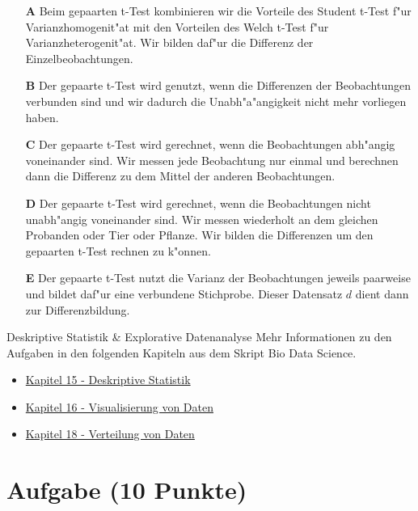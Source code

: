 \documentclass[a4paper, 10pt]{scrartcl}\usepackage[]{graphicx}\usepackage[]{xcolor}
\begin{document}
\begin{enumerate}
\item [\textbf{A} \msquare] Beim gepaarten t-Test kombinieren wir die Vorteile des Student t-Test f{"u}r Varianzhomogenit{"a}t mit den Vorteilen des Welch t-Test f{"u}r Varianzheterogenit{"a}t. Wir bilden daf{"u}r die Differenz der Einzelbeobachtungen.
\item [\textbf{B} \msquare] Der gepaarte t-Test wird genutzt, wenn die Differenzen der Beobachtungen verbunden sind und wir dadurch die Unabh{"a}{"a}ngigkeit nicht mehr vorliegen haben.
\item [\textbf{C} \msquare] Der gepaarte t-Test wird gerechnet, wenn die Beobachtungen abh{"a}ngig voneinander sind. Wir messen jede Beobachtung nur einmal und berechnen dann die Differenz zu dem Mittel der anderen Beobachtungen.
\item [\textbf{D} \msquare] Der gepaarte t-Test wird gerechnet, wenn die Beobachtungen nicht unabh{"a}ngig voneinander sind. Wir messen wiederholt an dem gleichen Probanden oder Tier oder Pflanze. Wir bilden die Differenzen um den gepaarten t-Test rechnen zu k{"o}nnen.
\item [\textbf{E} \msquare] Der gepaarte t-Test nutzt die Varianz der Beobachtungen jeweils paarweise und bildet daf{"u}r eine verbundene Stichprobe. Dieser Datensatz $d$ dient dann zur Differenzbildung.
\end{enumerate}
\clearpage
\begin{graybox}{Deskriptive Statistik \& Explorative Datenanalyse}
Mehr Informationen zu den Aufgaben in den folgenden Kapiteln aus dem Skript Bio Data Science.
  \begin{itemize}
  \item \href{https://jkruppa.github.io/eda-descriptive.html}{Kapitel 15 - Deskriptive Statistik}
  \item \href{https://jkruppa.github.io/eda-ggplot.html}{Kapitel 16 - Visualisierung von Daten}
  \item \href{https://jkruppa.github.io/eda-distribution.html}{Kapitel 18 - Verteilung von Daten}
  \end{itemize}
\end{graybox}
\clearpage

\section{Aufgabe \hfill (10 Punkte)}
\end{document}
